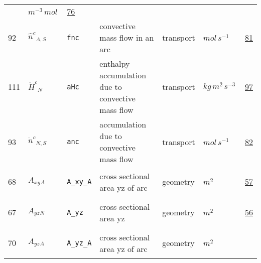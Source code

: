 \begin{longtable}{|p{1cm}|p{2.5cm}|p{4.5cm}|p{8cm}|p{3.0cm}|p{3cm}|p{1cm}|}
             & $ m^{-3} \,mol \, $
             &                 \hyperlink{"e:76"}{ 76 }
                 \\
            92
             & \hypertarget{"v:92"}{ $ {{\hat{n}^c}}{_{A, S}} $}
             & \verb|fnc|
             & convective mass flow in an arc
             & \begin{lay}transport \end{lay}
             & $ mol \,s^{-1} \, $
             &                 \hyperlink{"e:81"}{ 81 }
                 \\
            111
             & \hypertarget{"v:111"}{ $ {{\dot{H}^c}}{_{N}} $}
             & \verb|aHc|
             & enthalpy accumulation due to convective mass flow
             & \begin{lay}transport \end{lay}
             & $ kg \,m^{2} \,s^{-3} \, $
             &                 \hyperlink{"e:97"}{ 97 }
                 \\
            93
             & \hypertarget{"v:93"}{ $ {{\dot{n}^c}}{_{N, S}} $}
             & \verb|anc|
             & accumulation due to convective mass flow
             & \begin{lay}transport \end{lay}
             & $ mol \,s^{-1} \, $
             &                 \hyperlink{"e:82"}{ 82 }
                 \\
            68
             & \hypertarget{"v:68"}{ $ {{A_{xy}}}{_{A}} $}
             & \verb|A_xy_A|
             & cross sectional area yz of arc
             & \begin{lay}geometry \end{lay}
             & $ m^{2} \, $
             &                 \hyperlink{"e:57"}{ 57 }
                 \\
            67
             & \hypertarget{"v:67"}{ $ {{A_{yz}}}{_{N}} $}
             & \verb|A_yz|
             & cross sectional area yz
             & \begin{lay}geometry \end{lay}
             & $ m^{2} \, $
             &                 \hyperlink{"e:56"}{ 56 }
                 \\
            70
             & \hypertarget{"v:70"}{ $ {{A_{yz}}}{_{A}} $}
             & \verb|A_yz_A|
             & cross sectional area yz of arc
             & \begin{lay}geometry \end{lay}
             & $ m^{2} \, $

\end{longtable}
